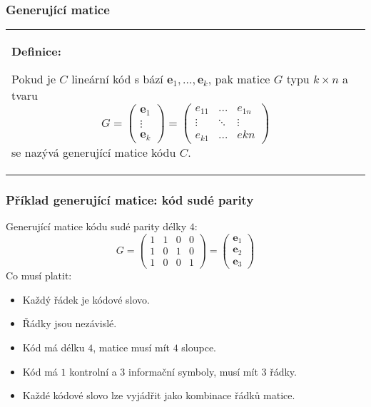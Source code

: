 \documentclass{beamer}
\newenvironment{definice}
{
    \begin{center}
    \begin{tabular}{p{9cm}}
    \textbf{Definice:}
}
{
    \end{tabular}
    \end{center}
}
\newcommand{\e}{\textbf{e}}
\newenvironment{itemizey}%
  {\large \begin{itemize}%
    \setlength{\itemsep}{6pt}%
    \setlength{\parskip}{6pt}}%
  {\end{itemize}}
\begin{document}
\begin{frame}[t,fragile]\frametitle{Generující matice} 
    \begin{definice}
        \item Pokud je $C$ lineární kód s bází $\e_1,\dots,\e_k$, pak matice $G$ typu $k\times n$ a tvaru
        $$
        G=
        \begin{pmatrix}
        \e_1\\
        \vdots\\
        \e_k
        \end{pmatrix}
        =
        \begin{pmatrix}
        e_{11}&\dots&e_{1n}\\
        \vdots&\ddots&\vdots\\
        e_{k1}&\dots&e{kn}
        \end{pmatrix}
        $$
        se nazývá generující matice kódu $C$.
    \end{definice}
\end{frame}


\begin{frame}[t,fragile]\frametitle{Příklad generující matice: kód sudé parity} 
Generující matice kódu sudé parity délky $4$:
$$
G=
\begin{pmatrix}
1&1&0&0\\
1&0&1&0\\
1&0&0&1
\end{pmatrix}
=
\begin{pmatrix}
\e_1\\
\e_2\\
\e_3
\end{pmatrix}
$$
Co musí platit:

\begin{itemizey}
    \item Každý řádek je kódové slovo.
    \item Řádky jsou nezávislé. 
    \item Kód má délku $4$, matice musí mít $4$ sloupce.
    \item Kód má $1$ kontrolní a 3 informační symboly, musí mít 3 řádky. 
    \item Každé kódové slovo lze vyjádřit jako kombinace řádků matice.
\end{itemizey}
\end{frame}
\end{document}

